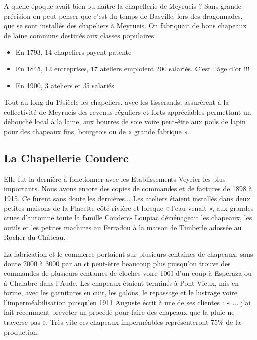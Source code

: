 


A quelle époque avait bien pu naître la chapellerie de Meyrueis ? Sans grande précision on
peut penser que c’est du temps de Basville, lors des dragonnades, que se sont installés des
chapeliers à Meyrueis. On fabriquait de bons chapeaux de laine communs destinés aux classes
populaires.\\

\begin{itemize}
\item En 1793, 14 chapeliers payent patente
\item En 1845, 12 entreprises, 17 ateliers emploient 200 salariés. C’est l’âge d’or !!!
\item En 1900, 3 ateliers et 35 salariés
\end{itemize}

\vspace{0.5em}

Tout au long du 19\ieme siècle les chapeliers, avec les tisserands, assurèrent à la collectivité de
Meyrueis des revenus réguliers et forts appréciables permettant un débouché local à la laine,
aux bourres de soie voire peut-être aux poils de lapin pour des chapeaux fins, bourgeois ou de
« grande fabrique ».

\medskip

\subsection{La Chapellerie Couderc}

Elle fut la dernière à fonctionner avec les Etablissements Veyrier les plus importants. Nous
avons encore des copies de commandes et de factures de 1898 à 1915. Ce furent sans doute
les dernières... Les ateliers étaient installés dans deux petites maisons de la Placette côté
rivière et lorsque « l’eau venait », aux grandes crues d’automne toute la famille Couderc-
Loupiac déménageait les chapeaux, les outils et les petites machines au Ferradou à la maison
de Timberle adossée au Rocher du Château.

\vspace{0.7em}

La fabrication et le commerce portaient sur plusieurs centaines de chapeaux, sans doute 2000 à
3000 par an et peut-être beaucoup plus puisqu’on trouve des commandes de plusieurs
centaines de cloches voire 1000 d’un coup à Espéraza ou à Chalabre dans l’Aude. Les
chapeaux étaient terminés à Pont Vieux, mis en forme, avec les garnitures en cuir, les galons,
le repassage et le lustrage voire l’imperméabilisation puisqu’en 1911 Auguste écrit à une de ses clientes : « ... j’ai fait récemment breveter un procédé pour faire des chapeaux que la pluie
ne traverse pas ». Très vite ces chapeaux imperméables représenteront 75\% de la production.

